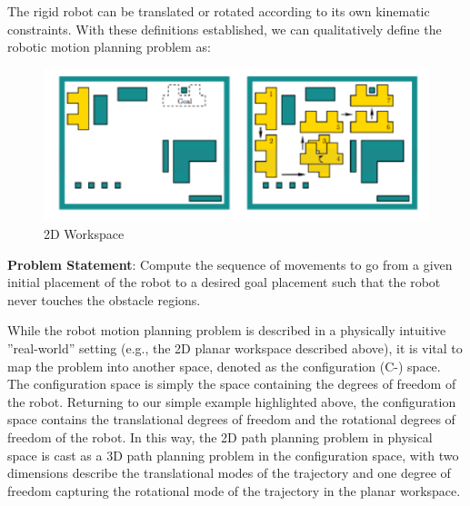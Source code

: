\documentclass[twoside]{article}
\begin{document}
The rigid robot can be translated or rotated according to its own kinematic constraints. With these definitions established, we can qualitatively define the robotic motion planning problem as:

\begin{figure}[h]
\begin{center}
\includegraphics{fig15_1.PNG}
\caption{2D Workspace}
\end{center}
\end{figure}

\textbf{Problem Statement}: Compute the sequence of movements to go from a given initial placement of the robot to a desired goal placement such that the robot never touches the obstacle regions.

While the robot motion planning problem is described in a physically intuitive ”real-world” setting (e.g., the 2D planar workspace described above), it is vital to map the problem into another space, denoted as the configuration (C-) space. The configuration space is simply the space containing the degrees of freedom of the robot. Returning to our simple example highlighted above, the configuration space contains
the translational degrees of freedom and the rotational degrees of freedom of the robot. In this way, the 2D path planning problem in physical space is cast as a 3D path planning problem in the configuration space, with two dimensions describe the translational modes of the trajectory and one degree of freedom capturing the rotational mode of the trajectory in the planar workspace.
 
\end{document}
